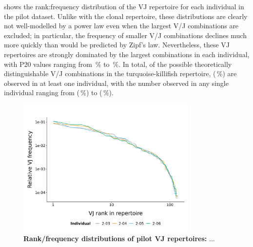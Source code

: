  shows the rank:frequency distribution of the VJ repertoire for each individual in the pilot dataset. Unlike with the clonal repertoire, these distributions are clearly not well-modelled by a power law even when the largest V/J combinations are excluded; in particular, the frequency of smaller V/J combinations declines much more quickly than would be predicted by Zipf's law. Nevertheless, these VJ repertoires are strongly dominated by the largest combinations in each individual, with P20 values ranging from \,\% to \,\%. In total, of the  possible theoretically distinguishable V/J combinations in the turquoise-killifish repertoire,  (\,\%) are observed in at least one individual, with the number observed in any single individual ranging from  (\,\%) to  (\,\%).

\begin{figure}
\centering
\includegraphics[width=0.8\textwidth]{_Figures/png/pilot-vj-rank-frequency}
\caption[Rank/frequency distributions of pilot VJ repertoires]{\textbf{Rank/frequency distributions of pilot VJ repertoires:} ...} %
\label{fig:igseq-pilot-vj-rank-frequency}
\end{figure}

